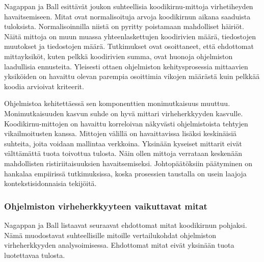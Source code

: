\documentclass[finnish]{../tktltiki2}
\theoremstyle{definition}
\theoremstyle{remark}
\begin{document}
    Nagappan ja Ball esittävät joukon suhteellisia koodikirnu-mittoja virhetiheyden havaitsemiseen. Mitat ovat 
normalisoituja arvoja koodikirnun aikana saaduista tuloksista. Normalisoinnilla niistä on pyritty poistamaan mahdolliset 
häiriöt. Näitä mittoja on muun muassa yhteenlaskettujen koodirivien määrä, tiedostojen muutokset ja tiedostojen määrä. 
Tutkimukset ovat osoittaneet, että ehdottomat mittayksiköt, kuten pelkkä koodirivien summa, ovat huonoja ohjelmiston 
laadullisia ennusteita. Yleisesti ottaen ohjelmiston kehitysprosessia mittaavien yksiköiden on havaittu olevan parempia
osoittimia vikojen määrästä kuin pelkkää koodia arvioivat kriteerit.

    Ohjelmistoa kehitettäessä sen komponenttien monimutkaisuus muuttuu. Monimutkaisuuden kasvun suhde on hyvä mittari 
virheherkkyyden kasvulle. Koodikirnu-mittojen on havaittu korreloivan näkyvästi ohjelmistoista tehtyjen vikailmoitusten 
kanssa. Mittojen välillä on havaittavissa lisäksi keskinäisiä suhteita, joita voidaan mallintaa verkkoina. Yksinään 
kyseiset mittarit eivät välttämättä tuota toivottua tulosta. Näin ollen mittoja verrataan keskenään mahdollisten 
ristiriitaisuuksien havaitsemiseksi. Johtopäätöksiin päätyminen on hankalaa empiirissä tutkimuksissa, koska prosessien 
taustalla on usein laajoja kontekstisidonnaisia tekijöitä.

\subsubsection{Ohjelmiston virheherkkyyteen vaikuttavat mitat}

Nagappan ja Ball listaavat seuraavat ehdottomat mitat koodikirnun pohjaksi. Nämä muodostavat suhteellisille mitoille 
vertailukohdat ohjelmiston virheherkkyyden analysoimisessa. Ehdottomat mitat eivät yksinään tuota luotettavaa tulosta.
\end{document}
